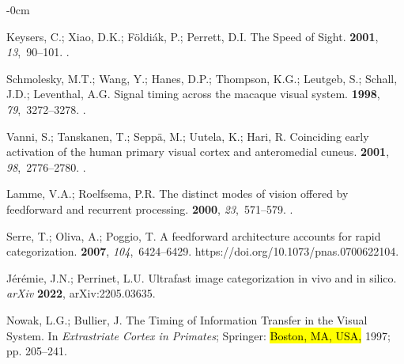 \documentclass[brainsci, %
               review,accept,pdftex,moreauthors
               ]{Definitions/mdpi}
\begin{document}
\begin{adjustwidth}{-\extralength}{0cm}
\begin{thebibliography}{999}
Keysers, C.; Xiao, D.K.; Földiák, P.; Perrett, D.I.
\newblock The {Speed} of {Sight}.
 {\bf 2001}, {\em
  13},~90--101.\linebreak
{}.

Schmolesky, M.T.; Wang, Y.; Hanes, D.P.; Thompson, K.G.; Leutgeb, S.; Schall,
  J.D.; Leventhal, A.G.
\newblock Signal timing across the macaque visual system.
 {\bf 1998}, {\em 79},~3272--3278.
.

Vanni, S.; Tanskanen, T.; Seppä, M.; Uutela, K.; Hari, R.
\newblock Coinciding early activation of the human primary visual cortex and
  anteromedial cuneus.
 {\bf 2001}, {\em 98},~2776--2780.
.

Lamme, V.A.; Roelfsema, P.R.
\newblock The distinct modes of vision offered by feedforward and recurrent
  processing.
 {\bf 2000}, {\em 23},~571--579.
.

Serre, T.; Oliva, A.; Poggio, T.
\newblock A feedforward architecture accounts for rapid categorization.
 {\bf 2007}, {\em 104},~6424--6429.
  {{https://doi.org/10.1073/pnas.0700622104}}.

Jérémie, J.N.; Perrinet, L.U.
\newblock Ultrafast image categorization in vivo and in silico. \emph{arXiv}  \textbf{2022}, 
\newblock arXiv:2205.03635.

Nowak, L.G.; Bullier, J.
\newblock The {Timing} of {Information} {Transfer} in the {Visual} {System}. In
  {\em Extrastriate {Cortex} in {Primates}}; Springer: \hl{Boston, MA, USA,} %
  1997; pp. 205--241.


\end{thebibliography}
\end{adjustwidth}
\end{document}
